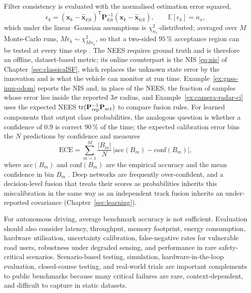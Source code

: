 Filter consistency is evaluated with the normalised estimation error squared,
\begin{equation}
\epsilon_{k}=(\mathbf{x}_{k}-\widehat{\mathbf{x}}_{k|k})^{\mathsf T}\mathbf{P}_{k|k}^{-1}(\mathbf{x}_{k}-\widehat{\mathbf{x}}_{k|k}),
\qquad
\mathbb{E}[\epsilon_{k}]=n_{x},
\label{eq:nees}
\end{equation}
which under the linear--Gaussian assumptions is $\chi^{2}_{n_{x}}$-distributed; averaged over $M$ Monte-Carlo runs, $M\bar{\epsilon}_{k}\sim\chi^{2}_{Mn_{x}}$, so that a two-sided $95$\,\% acceptance region can be tested at every time step \cite{barshalom2001_estimation}. The NEES requires ground truth and is therefore an offline, dataset-based metric; its online counterpart is the NIS \eqref{eq:nis} of Chapter~\ref{sec:classicalSF}, which replaces the unknown state error by the innovation and is what the vehicle can monitor at run time. Example~\ref{ex:gnss-imu-odom} reports the NIS and, in place of the NEES, the fraction of samples whose error lies inside the reported $3\sigma$ radius, and Example~\ref{ex:camera-radar-ci} uses the expected NEES $\operatorname{tr}(\mathbf{P}_{\mathrm{rep}}^{-1}\mathbf{P}_{\mathrm{act}})$ to compare fusion rules. For learned components that output class probabilities, the analogous question is whether a confidence of $0.9$ is correct $90$\,\% of the time; the expected calibration error bins the $N$ predictions by confidence and measures
\begin{equation}
\mathrm{ECE}=\sum_{m=1}^{M}\frac{|B_{m}|}{N}\,\big|\mathrm{acc}(B_{m})-\mathrm{conf}(B_{m})\big|,
\label{eq:ece-metric}
\end{equation}
where $\mathrm{acc}(B_{m})$ and $\mathrm{conf}(B_{m})$ are the empirical accuracy and the mean confidence in bin $B_{m}$ \cite{guo2017_calibration}. Deep networks are frequently over-confident, and a decision-level fusion that treats their scores as probabilities inherits this miscalibration in the same way as an independent track fusion inherits an under-reported covariance (Chapter~\ref{sec:learning}).

For autonomous driving, average benchmark accuracy is not sufficient. Evaluation should also consider latency, throughput, memory footprint, energy consumption, hardware utilisation, uncertainty calibration, false-negative rates for vulnerable road users, robustness under degraded sensing, and performance in rare safety-critical scenarios. Scenario-based testing, simulation, hardware-in-the-loop evaluation, closed-course testing, and real-world trials are important complements to public benchmarks because many critical failures are rare, context-dependent, and difficult to capture in static datasets.

